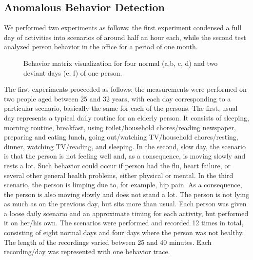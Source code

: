 \subsection{Anomalous Behavior Detection}
\label{sec:experiments:behavior}

We performed two experiments as follows: the first experiment condensed a full day of activities into scenarios of around half an hour each, while the second test analyzed person behavior in the office for a period of one month.


\begin{figure}[h!t]
 \centering



 \caption{Behavior matrix visualization for four normal (a,b, c, d) and two deviant days (e, f) of one person.}
 \label{fig:days}
\end{figure}

The first experiments proceeded as follows: the measurements were performed on two people aged between 25 and 32 years, with each day corresponding to a particular scenario, basically the same for each of the persons. The first, usual day represents a typical daily routine for an elderly person. It consists of sleeping, morning routine, breakfast, using toilet/household chores/reading newspaper, preparing and eating lunch, going out/watching TV/household chores/resting, dinner, watching TV/reading, and sleeping. In the second, slow day, the scenario is that the person is not feeling well and, as a consequence, is moving slowly and rests a lot. Such behavior could occur if person had the flu, heart failure, or several other general health problems, either physical or mental. In the third scenario, the person is limping due to, for example, hip pain. As a consequence, the person is also moving slowly and does not stand a lot. The person is not lying as much as on the previous day, but sits more than usual. Each person was given a loose daily scenario and an approximate timing for each activity, but performed it on her/his own. The scenarios were performed and recorded 12 times in total, consisting of eight normal days and four days where the person was not healthy. 
The length of the recordings varied between 25 and 40 minutes. Each recording/day was represented with one behavior trace.


